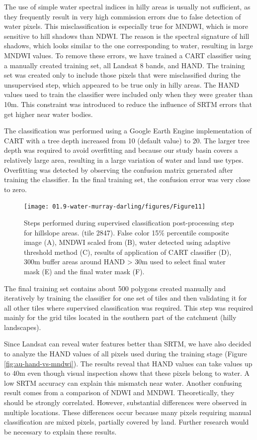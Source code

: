 The use of simple water spectral indices in hilly areas is usually not sufficient, as they frequently result in very high commission errors due to false detection of water pixels. This misclassification is especially true for \gls{MNDWI}, which is more sensitive to hill shadows than \gls{NDWI}. The reason is the spectral signature of hill shadows, which looks similar to the one corresponding to water, resulting in large \gls{MNDWI} values. To remove these errors, we have trained a \gls{CART} classifier using a manually created training set, all Landsat 8 bands, and \gls{HAND}. The training set was created only to include those pixels that were misclassified during the unsupervised step, which appeared to be true only in hilly areas. The \gls{HAND} values used to train the classifier were included only when they were greater than 10m. This constraint was introduced to reduce the influence of \gls{SRTM} errors that get higher near water bodies.

The classification was performed using a Google Earth Engine implementation of \gls{CART} with a tree depth increased from 10 (default value) to 20. The larger tree depth was required to avoid overfitting and because our study basin covers a relatively large area, resulting in a large variation of water and land use types. Overfitting was detected by observing the confusion matrix generated after training the classifier. In the final training set, the confusion error was very close to zero. 

\begin{figure}[H]
	\centering
	\texttt{[image: 01.9-water-murray-darling/figures/Figure11]}
	\caption{Steps performed during supervised classification post-processing step for hillslope areas. (tile 2847). False color 15\% percentile composite image (A), \gls{MNDWI} scaled from (B), water detected using adaptive threshold method (C), results of application of \gls{CART} classifier (D), 300m buffer areas around HAND > 30m used to select final water mask (E) and the final water mask (F).}
\end{figure}

The final training set contains about 500 polygons created manually and iteratively by training the classifier for one set of tiles and then validating it for all other tiles where supervised classification was required. This step was required mainly for the grid tiles located in the southern part of the catchment (hilly landscapes).

Since Landsat can reveal water features better than \gls{SRTM}, we have also decided to analyze the \gls{HAND} values of all pixels used during the training stage (Figure \ref{fig:au-hand-vs-mndwi}). The results reveal that \gls{HAND} values can take values up to 40m even though visual inspection shows that these pixels belong to water. A low \gls{SRTM} accuracy can explain this mismatch near water. Another confusing result comes from a comparison of \gls{NDWI} and \gls{MNDWI}. Theoretically, they should be strongly correlated. However, substantial differences were observed in multiple locations. These differences occur because many pixels requiring manual classification are mixed pixels, partially covered by land. Further research would be necessary to explain these results.

